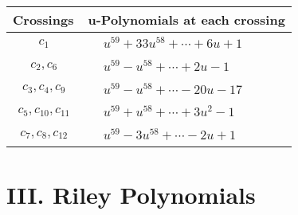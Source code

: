 \documentclass[1p]{elsarticle_modified}
\theoremstyle{definition}
\begin{document}
\begin{tabular}{m{50pt}|m{274pt}}
Crossings & \hspace{64pt}u-Polynomials at each crossing \\
\hline $$\begin{aligned}c_{1}\end{aligned}$$&$\begin{aligned}
&u^{59}+33 u^{58}+\cdots+6 u+1
\end{aligned}$\\
\hline $$\begin{aligned}c_{2},c_{6}\end{aligned}$$&$\begin{aligned}
&u^{59}- u^{58}+\cdots+2 u-1
\end{aligned}$\\
\hline $$\begin{aligned}c_{3},c_{4},c_{9}\end{aligned}$$&$\begin{aligned}
&u^{59}- u^{58}+\cdots-20 u-17
\end{aligned}$\\
\hline $$\begin{aligned}c_{5},c_{10},c_{11}\end{aligned}$$&$\begin{aligned}
&u^{59}+u^{58}+\cdots+3 u^2-1
\end{aligned}$\\
\hline $$\begin{aligned}c_{7},c_{8},c_{12}\end{aligned}$$&$\begin{aligned}
&u^{59}-3 u^{58}+\cdots-2 u+1
\end{aligned}$\\
\hline
\end{tabular}\newpage\renewcommand{\arraystretch}{1}
\centering \section*{ III. Riley Polynomials}
\end{document}

